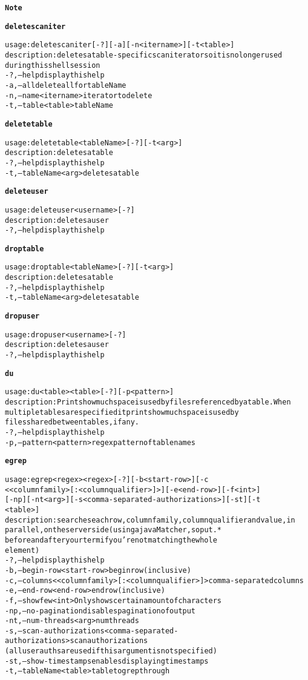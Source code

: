 \begin{alltt}
\textbf{Note}


\textbf{deletescaniter}

    usage: deletescaniter [-?] [-a] [-n <itername>] [-t <table>]
    description: deletes a table-specific scan iterator so it is no longer used
    	      during this shell session
      -?,--help  display this help
      -a,--all  delete all for tableName
      -n,--name <itername>	iterator to delete
      -t,--table <table>  tableName

\textbf{deletetable}

    usage: deletetable <tableName> [-?] [-t <arg>]
    description: deletes a table
      -?,--help  display this help
      -t,--tableName <arg>	deletes a table

\textbf{deleteuser}

    usage: deleteuser <username> [-?]
    description: deletes a user
      -?,--help  display this help

\textbf{droptable}

    usage: droptable <tableName> [-?] [-t <arg>]
    description: deletes a table
      -?,--help  display this help
      -t,--tableName <arg>	deletes a table

\textbf{dropuser}

    usage: dropuser <username> [-?]
    description: deletes a user
      -?,--help  display this help

\textbf{du}

    usage: du <table>{ <table>} [-?] [-p <pattern>]
    description: Prints how much space is used by files referenced by a table.  When
    	      multiple tables are specified it prints how much space is used by
    	      files shared between tables, if any.
      -?,--help  display this help
      -p,--pattern <pattern>  regex pattern of table names

\textbf{egrep}

    usage: egrep <regex>{ <regex>} [-?] [-b <start-row>] [-c
    	      <{<columnfamily>[:<columnqualifier>]}>] [-e <end-row>] [-f <int>]
    	      [-np] [-nt <arg>] [-s <comma-separated-authorizations>] [-st] [-t
    	      <table>]
    description: searches each row, column family, column qualifier and value, in
    	      parallel, on the server side (using a java Matcher, so put .*
    	      before and after your term if you're not matching the whole
    	      element)
      -?,--help  display this help
      -b,--begin-row <start-row>  begin row (inclusive)
      -c,--columns <{<columnfamily>[:<columnqualifier>]}>  comma-separated columns
      -e,--end-row <end-row>  end row (inclusive)
      -f,--show few <int>  Only shows certain amount of characters
      -np,--no-pagination  disables pagination of output
      -nt,--num-threads <arg>  num threads
      -s,--scan-authorizations <comma-separated-authorizations>  scan authorizations
    	      (all user auths are used if this argument is not specified)
      -st,--show-timestamps  enables displaying timestamps
      -t,--tableName <table>  table to grep through


\end{alltt}
